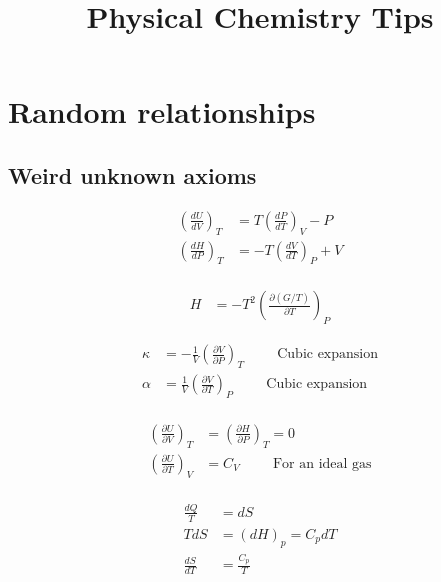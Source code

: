 \documentclass[10pt]{article} %
\title{Physical Chemistry Tips}
\begin{document}
\maketitle{}

\section{Random relationships}

\subsection{Weird unknown axioms}

\begin{align*}
  \left(\frac{dU}{dV}\right)_T &= T\left(\frac{dP}{dT}\right)_V - P\\
  \left(\frac{dH}{dP}\right)_T &= -T\left(\frac{dV}{dT}\right)_P + V\\
\end{align*}

\begin{align*}
  H &= -T^2\left(\frac{\partial\left(G/T\right)}{\partial T}\right)_P
\end{align*}

\begin{align*}
  \kappa &= -\frac{1}{V}\left(\frac{\partial V}{\partial P}\right)_T \hspace{1cm} \mbox{Cubic expansion}\\
\alpha &= \frac{1}{V}\left(\frac{\partial V}{\partial T}\right)_P \hspace{1cm} \mbox{Cubic expansion}\\
\end{align*}

\begin{align*}
  \left(\frac{\partial U}{\partial V}\right)_T &= \left(\frac{\partial H}{\partial P}\right)_T = 0\\
  \left(\frac{\partial U}{\partial T}\right)_V &= C_V \hspace{1cm} \mbox{For an ideal gas}\\
\end{align*}

\begin{align*}
  \frac{dQ}{T} &= dS\\
  TdS &= (dH)_p = C_pdT\\
  \frac{dS}{dT} &=\frac{C_p}{T}\\
\end{align*}
\end{document}
